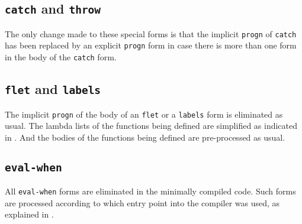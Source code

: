 \subsection{\texttt{catch} and \texttt{throw}}

The only change made to these special forms is that the implicit
\texttt{progn} of \texttt{catch} has been replaced by an explicit
\texttt{progn} form in case there is more than one form in the body of
the \texttt{catch} form.

\subsection{\texttt{flet} and \texttt{labels}}

The implicit \texttt{progn} of the body of an \texttt{flet} or a
\texttt{labels} form is eliminated as usual.  The lambda lists of the
functions being defined are simplified as indicated in
.  And the bodies of the
functions being defined are pre-processed as usual.

\subsection{\texttt{eval-when}}

All \texttt{eval-when} forms are eliminated in the minimally compiled
code.  Such forms are processed according to which entry point into
the compiler was used, as explained in .
